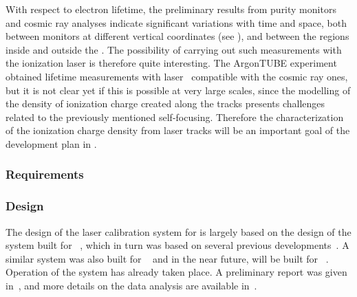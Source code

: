 With respect to electron lifetime, the preliminary results from  purity monitors and cosmic ray analyses indicate significant variations with time and space, both between monitors at different vertical coordinates (see  \spchcisc), and between the regions inside and outside the . The possibility of carrying out such measurements with the ionization laser is therefore quite interesting. The ArgonTUBE experiment obtained lifetime measurements with laser~\cite{Ereditato:2013xaa} compatible with the cosmic ray ones, but it is not clear yet if this is possible at very large scales, since the modelling of the density of ionization charge created along the tracks presents challenges related to the previously mentioned self-focusing. Therefore the characterization of the ionization charge density from laser tracks will be an important goal of the development plan in .



\subsubsection{Requirements}
\label{sec:dp-calib-laser-req}



\subsubsection{Design}
\label{sec:sp-calib-sys-las-ion-des}

The design of the laser calibration system for  is largely based on the design of the system built for ~\cite{microboone}, which in turn was based on several previous developments~\cite{Rossi:2009im,Zeller:2013sva,Ereditato:2014lra,Ereditato:82014tya}. A similar system was also built for ~\cite{Berns:2013usa} and in the near future, will be built for ~\cite{Antonello:2015lea}. Operation of the  system has already taken place. A preliminary report was given in~\cite{bib:chen2018}, and more details on the data analysis are available in~\cite{bib:uBlaser2019}.

